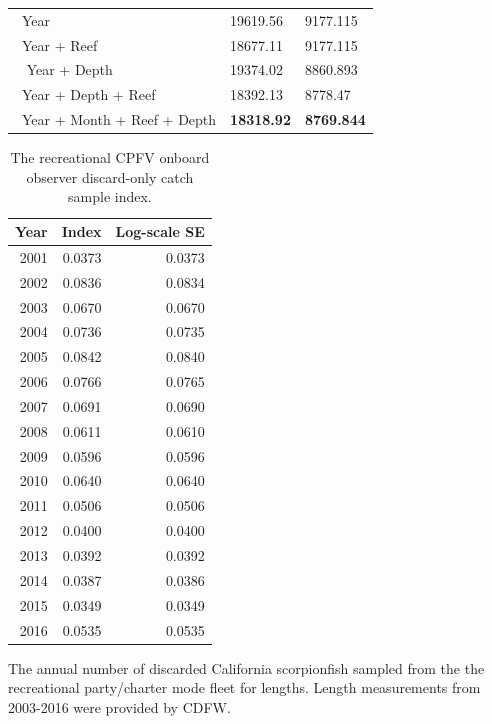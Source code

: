 \documentclass[12pt,]{article}
\begin{document}
\begin{table}[ht]
\begin{tabular}{lll}
  \hline
~Year & 19619.56 & 9177.115 \\ 
  ~Year + Reef & 18677.11 & 9177.115 \\ 
  ~ Year + Depth & 19374.02 & 8860.893 \\ 
  ~Year + Depth + Reef & 18392.13 & 8778.47 \\ 
  ~Year + Month + Reef + Depth & \textbf{18318.92} & \textbf{8769.844} \\ 
   \hline
\end{tabular}
\end{table}\begin{table}[ht]
\centering
\caption{The recreational CPFV
                                            onboard observer discard-only
                                            catch sample index.} 
\label{tab:Fleet6_RecDD_onboard_index}
\begin{tabular}{rrr}
  \hline
Year & Index & Log-scale SE \\ 
  \hline
 2001 & 0.0373 & 0.0373 \\ 
   2002 & 0.0836 & 0.0834 \\ 
   2003 & 0.0670 & 0.0670 \\ 
   2004 & 0.0736 & 0.0735 \\ 
   2005 & 0.0842 & 0.0840 \\ 
   2006 & 0.0766 & 0.0765 \\ 
   2007 & 0.0691 & 0.0690 \\ 
   2008 & 0.0611 & 0.0610 \\ 
   2009 & 0.0596 & 0.0596 \\ 
   2010 & 0.0640 & 0.0640 \\ 
   2011 & 0.0506 & 0.0506 \\ 
   2012 & 0.0400 & 0.0400 \\ 
   2013 & 0.0392 & 0.0392 \\ 
   2014 & 0.0387 & 0.0386 \\ 
   2015 & 0.0349 & 0.0349 \\ 
   2016 & 0.0535 & 0.0535 \\ 
   \hline
\end{tabular}
\end{table}\begin{table}[ht]
\centering
\caption{The annual number of discarded California scorpionfish 
                                              sampled from the the recreational party/charter 
                                              mode fleet for lengths. Length measurements
                                            from 2003-2016 were provided by CDFW.  
}
\end{table}
\end{document}
